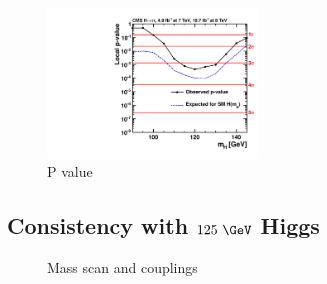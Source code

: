 \begin{figure}[h!]
\includegraphics[width=0.5\textwidth]{plots/htt-sm/cmb_p-value.pdf}
\caption{P value}
\label{fig:results-limit}
\end{figure}


\subsection{Consistency with $125~\GeV$ Higgs}
\label{sec:consistency}

\begin{figure}[h!]
\caption{Mass scan and couplings}
\label{fig:results-properties}
\end{figure}

